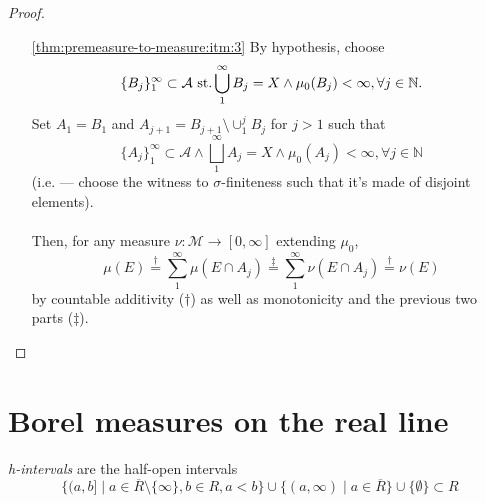 \begin{proof}
\begin{itemize}
    \paragraph{}
    If $\mu(E)<\infty$,
    by definition of $\mu$ and $\mu^*$,
    \[
    \forall \epsilon>0 \exists \{A_j\}_1^\infty\subset\mathcal A \st
    E\subset \cup_1^\infty A_j =: A \land
    \big [
      \mu(A) < \mu(E) + \epsilon \Leftrightarrow
      \mu(A\setminus E) < \epsilon
      \big ]
    \]
    and hence
    \[
    \mu(E)\leq\mu(A)\stackrel{*}{=} \nu(A)
    = \nu(E) + \nu(A\setminus E)
    \stackrel{\ddag}{\leq} \nu(E) + \mu(A\setminus E)
    \leq \nu(E) + \epsilon,
    \]
    where $\ddag$ follows from the first statement of this part as
    proven in the previous paragraph, completing remaining inequality
    for the proof that $\mu(E)=\nu(E)$ in the case that $\mu(E)<\infty$
    since $\epsilon>0$ arbitrary.
  \item[\ref{thm:premeasure-to-measure:itm:3}]
    By hypothesis, choose
    \[
    \{B_j\}_1^\infty\subset\mathcal A \operatorname{\,st.}
    \bigcup_1^\infty B_j = X \land
    \mu_0(B_j)<\infty,\forall j\in\mathbb N.
    \]
    Set $A_1 = B_1$ and $A_{j+1} = B_{j+1}\setminus\cup_1^j B_j$
    for $j>1$ such that
    \[
    \{A_j\}_1^\infty\subset\mathcal A \land
    \bigsqcup_1^\infty A_j = X \land
    \mu_0(A_j)<\infty,\forall j\in\mathbb N
    \]
    (i.e. --- choose the witness to $\sigma$-finiteness such that
    it's made of disjoint elements).
    \paragraph{}
    Then, for any measure $\nu:\mathcal M\rightarrow [0,\infty]$
    extending $\mu_0$,
    \[
    \mu(E) \stackrel{\dag}{=} \sum_1^\infty \mu(E\cap A_j)
    \stackrel{\ddag}{=}
    \sum_1^\infty \nu(E \cap A_j) \stackrel{\dag}{=} \nu(E)
    \]
    by countable additivity ($\dag$) as well as
    monotonicity and the previous two parts ($\ddag$).
  \end{itemize}
\end{proof}

\section{Borel measures on the real line}
\begin{defn}
  \emph{h-intervals} are the half-open intervals
  \[
  \{(a,b]\mid a\in\overline R\setminus\{\infty\}, b\in R, a<b\} \cup
    \{(a,\infty)\mid a\in\overline R\} \cup \{\emptyset\} \subset R
    \]
\end{defn}

